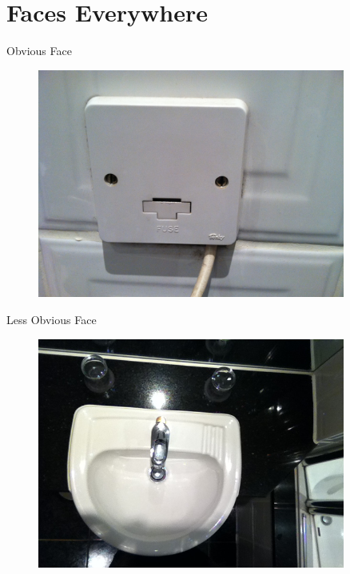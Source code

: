 \documentclass[compress]{beamer}
\begin{document}

\section{Faces Everywhere}

\begin{frame}{Obvious Face}
  \begin{figure}
    \includegraphics[width=0.9\textwidth]{assets/obviousface.jpg}
  \end{figure}
\end{frame}

\begin{frame}{Less Obvious Face}
  \begin{figure}
    \includegraphics[width=0.9\textwidth]{assets/lessobviousface.jpg}
  \end{figure}
\end{frame}
\end{document}
